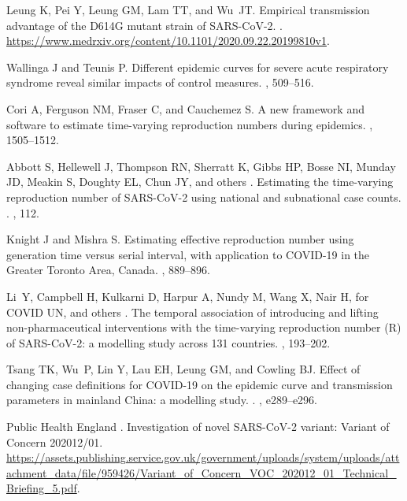 \documentclass[12pt]{article}
\begin{document}
\begin{thebibliography}{10}
Leung K, Pei Y, Leung GM, Lam TT, and Wu~JT.
 {Empirical transmission advantage of the D614G mutant strain of
  SARS-CoV-2}.
.
\newblock \url{https://www.medrxiv.org/content/10.1101/2020.09.22.20199810v1}.

Wallinga J and Teunis P.
 Different epidemic curves for severe acute respiratory syndrome
  reveal similar impacts of control measures.
, 509--516.

Cori A, Ferguson NM, Fraser C, and Cauchemez S.
 A new framework and software to estimate time-varying
  reproduction numbers during epidemics.
, 1505--1512.

Abbott S, Hellewell J, Thompson RN, Sherratt K, Gibbs HP, Bosse NI, Munday JD,
  Meakin S, Doughty EL, Chun JY, and others .
 {Estimating the time-varying reproduction number of SARS-CoV-2
  using national and subnational case counts}.
.
, 112.

Knight J and Mishra S.
 {Estimating effective reproduction number using generation time
  versus serial interval, with application to COVID-19 in the Greater Toronto
  Area, Canada}.
, 889--896.

Li~Y, Campbell H, Kulkarni D, Harpur A, Nundy M, Wang X, Nair H, for COVID UN,
  and others .
 {The temporal association of introducing and lifting
  non-pharmaceutical interventions with the time-varying reproduction number
  (R) of SARS-CoV-2: a modelling study across 131 countries}.
, 193--202.

Tsang TK, Wu~P, Lin Y, Lau EH, Leung GM, and Cowling BJ.
 {Effect of changing case definitions for COVID-19 on the
  epidemic curve and transmission parameters in mainland China: a modelling
  study}.
.
, e289--e296.

{Public Health England} .
 {Investigation of novel SARS-CoV-2 variant: Variant of Concern
  202012/01}.
\newblock
  \url{https://assets.publishing.service.gov.uk/government/uploads/system/uploads/attachment_data/file/959426/Variant_of_Concern_VOC_202012_01_Technical_Briefing_5.pdf}.


\end{thebibliography}
\end{document}
